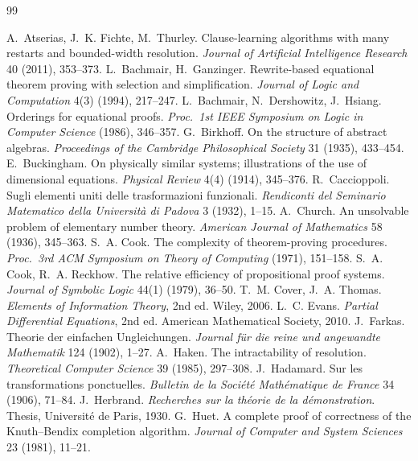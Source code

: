 \begin{thebibliography}{99}
\small
{}

 A.~Atserias, J.~K. Fichte, M.~Thurley. Clause-learning algorithms with many restarts and bounded-width resolution. \emph{Journal of Artificial Intelligence Research} 40 (2011), 353--373.
 L.~Bachmair, H.~Ganzinger. Rewrite-based equational theorem proving with selection and simplification. \emph{Journal of Logic and Computation} 4(3) (1994), 217--247.
 L.~Bachmair, N.~Dershowitz, J.~Hsiang. Orderings for equational proofs. \emph{Proc.\ 1st IEEE Symposium on Logic in Computer Science} (1986), 346--357.
 G.~Birkhoff. On the structure of abstract algebras. \emph{Proceedings of the Cambridge Philosophical Society} 31 (1935), 433--454.
 E.~Buckingham. On physically similar systems; illustrations of the use of dimensional equations. \emph{Physical Review} 4(4) (1914), 345--376.
 R.~Caccioppoli. Sugli elementi uniti delle trasformazioni funzionali. \emph{Rendiconti del Seminario Matematico della Universit\`a di Padova} 3 (1932), 1--15.
 A.~Church. An unsolvable problem of elementary number theory. \emph{American Journal of Mathematics} 58 (1936), 345--363.
 S.~A. Cook. The complexity of theorem-proving procedures. \emph{Proc.\ 3rd ACM Symposium on Theory of Computing} (1971), 151--158.
 S.~A. Cook, R.~A. Reckhow. The relative efficiency of propositional proof systems. \emph{Journal of Symbolic Logic} 44(1) (1979), 36--50.
 T.~M. Cover, J.~A. Thomas. \emph{Elements of Information Theory}, 2nd ed. Wiley, 2006.
 L.~C. Evans. \emph{Partial Differential Equations}, 2nd ed. American Mathematical Society, 2010.
 J.~Farkas. Theorie der einfachen Ungleichungen. \emph{Journal f\"ur die reine und angewandte Mathematik} 124 (1902), 1--27.
 A.~Haken. The intractability of resolution. \emph{Theoretical Computer Science} 39 (1985), 297--308.
 J.~Hadamard. Sur les transformations ponctuelles. \emph{Bulletin de la Soci\'et\'e Math\'ematique de France} 34 (1906), 71--84.
 J.~Herbrand. \emph{Recherches sur la th\'eorie de la d\'emonstration}. Thesis, Universit\'e de Paris, 1930.
 G.~Huet. A complete proof of correctness of the Knuth--Bendix completion algorithm. \emph{Journal of Computer and System Sciences} 23 (1981), 11--21.

\end{thebibliography}
